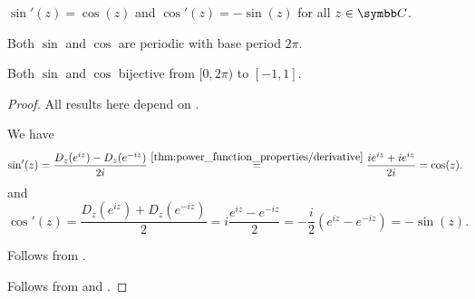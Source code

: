 \begin{proposition}\label{thm:trigonometric_function_properties}
  \mbox{}
  \begin{propenum}
     \( \sin'(z) = \cos(z) \) and \( \cos'(z) = -\sin(z) \) for all \( z \in \BC \).

     Both \( \sin \) and \( \cos \) are periodic with base period \( 2\pi \).

     Both \( \sin \) and \( \cos \) bijective from \( [0, 2\pi) \) to \( [-1, 1] \).
  \end{propenum}
\end{proposition}
\begin{proof}
  All results here depend on .

   We have
  \begin{equation*}
    \sin'(z)
    =
    \frac {D_z(e^{iz}) - D_z(e^{-iz})} {2i}
    \overset {\ref{thm:power_function_properties/derivative}} =
    \frac {i e^{iz} + i e^{iz}} {2i}
    =
    \cos(z).
  \end{equation*}
  and
  \begin{equation*}
    \cos'(z)
    =
    \frac {D_z(e^{iz}) + D_z(e^{-iz})} 2
    =
    i \frac {e^{iz} - e^{-iz}} 2
    =
    - \frac i 2 (e^{iz} - e^{-iz})
    =
    - \sin(z).
  \end{equation*}

   Follows from .

   Follows from  and .
\end{proof}

